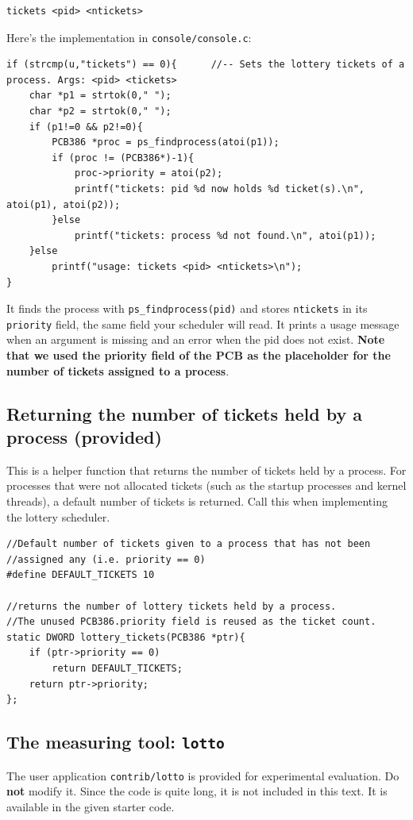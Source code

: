 \documentclass[a4paper, 11pt,oneside]{article}
\begin{document}
\begin{verbatim}
tickets <pid> <ntickets>
\end{verbatim}

Here's the implementation in \texttt{console/console.c}:

\begin{verbatim}
if (strcmp(u,"tickets") == 0){      //-- Sets the lottery tickets of a process. Args: <pid> <tickets>
	char *p1 = strtok(0," ");
	char *p2 = strtok(0," ");
	if (p1!=0 && p2!=0){
		PCB386 *proc = ps_findprocess(atoi(p1));
		if (proc != (PCB386*)-1){
			proc->priority = atoi(p2);
			printf("tickets: pid %d now holds %d ticket(s).\n", atoi(p1), atoi(p2));
		}else
			printf("tickets: process %d not found.\n", atoi(p1));
	}else
		printf("usage: tickets <pid> <ntickets>\n");
}
\end{verbatim}

It finds the process with \texttt{ps\_findprocess(pid)} and stores \texttt{ntickets} in its \texttt{priority} field, the same field your scheduler will read. It prints a usage message when an argument is missing and an error when the pid does not exist. \textbf{Note that we used the priority field of the PCB as the placeholder for the number of tickets assigned to a process}.


\subsection*{Returning the number of tickets held by a process (provided)}
This is a helper function that returns the number of tickets held by a process. For processes that were not allocated tickets (such as the startup processes and kernel threads), a default number of tickets is returned. Call this when implementing the lottery scheduler.


\begin{verbatim}
//Default number of tickets given to a process that has not been
//assigned any (i.e. priority == 0)
#define DEFAULT_TICKETS 10

//returns the number of lottery tickets held by a process.
//The unused PCB386.priority field is reused as the ticket count.
static DWORD lottery_tickets(PCB386 *ptr){
	if (ptr->priority == 0) 
		return DEFAULT_TICKETS;
	return ptr->priority;
};
\end{verbatim}


\subsection*{The measuring tool: \texttt{lotto}}
The user application \texttt{contrib/lotto} is provided for experimental evaluation. Do \textbf{not} modify it. Since the code is quite long, it is not included in this text. It is available in the given starter code.
\end{document}
